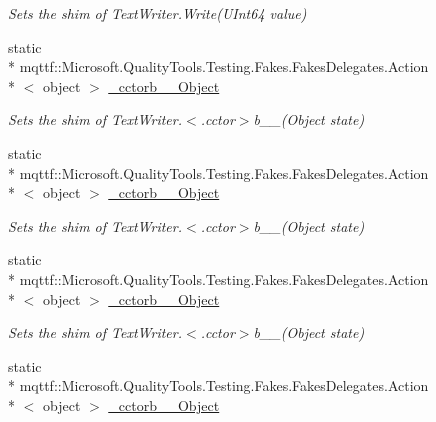 \begin{DoxyCompactItemize}
\begin{DoxyCompactList}\small\item\em Sets the shim of Text\-Writer.\-Write(\-U\-Int64 value)\end{DoxyCompactList}\item 
static \\*
mqttf\-::\-Microsoft.\-Quality\-Tools.\-Testing.\-Fakes.\-Fakes\-Delegates.\-Action\\*
$<$ object $>$ \hyperlink{class_system_1_1_i_o_1_1_fakes_1_1_shim_text_writer_a797dd2c65261edfb8d457edc1526935f}{\-\_\-cctorb\-\_\-\-\_\-Object}
\begin{DoxyCompactList}\small\item\em Sets the shim of Text\-Writer.$<$.cctor$>$b\-\_\-\-\_(\-Object state)\end{DoxyCompactList}\item 
static \\*
mqttf\-::\-Microsoft.\-Quality\-Tools.\-Testing.\-Fakes.\-Fakes\-Delegates.\-Action\\*
$<$ object $>$ \hyperlink{class_system_1_1_i_o_1_1_fakes_1_1_shim_text_writer_a497a0d50e435f52413334ace8465aa67}{\-\_\-cctorb\-\_\-\-\_\-Object}
\begin{DoxyCompactList}\small\item\em Sets the shim of Text\-Writer.$<$.cctor$>$b\-\_\-\-\_(\-Object state)\end{DoxyCompactList}\item 
static \\*
mqttf\-::\-Microsoft.\-Quality\-Tools.\-Testing.\-Fakes.\-Fakes\-Delegates.\-Action\\*
$<$ object $>$ \hyperlink{class_system_1_1_i_o_1_1_fakes_1_1_shim_text_writer_a6d500c175f1d59bf2ea2c39eb735bab7}{\-\_\-cctorb\-\_\-\-\_\-Object}
\begin{DoxyCompactList}\small\item\em Sets the shim of Text\-Writer.$<$.cctor$>$b\-\_\-\-\_(\-Object state)\end{DoxyCompactList}\item 
static \\*
mqttf\-::\-Microsoft.\-Quality\-Tools.\-Testing.\-Fakes.\-Fakes\-Delegates.\-Action\\*
$<$ object $>$ \hyperlink{class_system_1_1_i_o_1_1_fakes_1_1_shim_text_writer_af8877eed3075952b3c10bbedc0420fee}{\-\_\-cctorb\-\_\-\-\_\-Object}

\end{DoxyCompactItemize}
